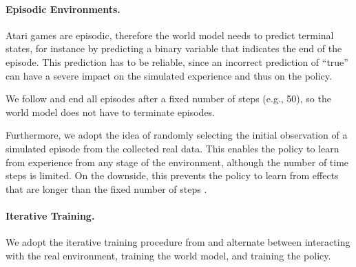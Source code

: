 \documentclass{article}
\begin{document}
\begin{table}[t]
	\centering
  \vskip -0.084in
	\caption{Number of parameters of our models in detail. The encoder and decoder
  both need access to the embedding vectors, therefore the sum of their
  individual number of parameters is slightly higher than for the total VQ-VAE.}
  \label{tab:parameters-detail}
	\vskip 0.15in
\vskip -0.1in
\end{table}

\paragraph{Episodic Environments.}
Atari games are episodic, therefore the world model needs to predict terminal
states, for instance by predicting a binary variable that indicates the end of
the episode. This prediction has to be reliable, since an incorrect prediction
of ``true'' can have a severe impact on the simulated experience and thus on
the policy.

We follow \citet{simple} and end all episodes after a fixed number of steps
(e.g., 50), so the world model does not have to terminate episodes.

Furthermore, we adopt the idea of randomly selecting the initial observation of
a simulated episode from the collected real data. This enables the policy to
learn from experience from any stage of the environment, although the number of
time steps is limited. On the downside, this prevents the policy to learn from
effects that are longer than the fixed number of steps \cite{simple}.

\paragraph{Iterative Training.}
We adopt the iterative training procedure from \citet{simple} and alternate
between interacting with the real environment, training the world model, and
training the policy.
\end{document}
